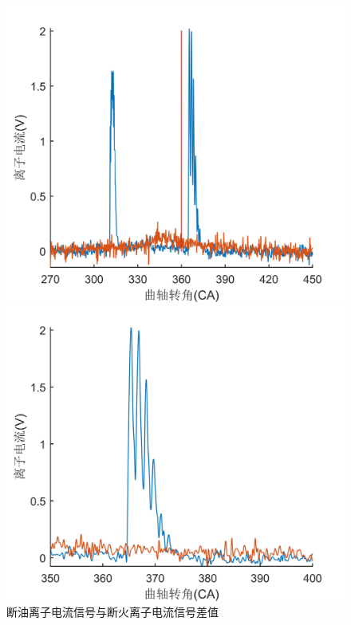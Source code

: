 \begin{figure}[htb]
	\begin{minipage}[t]{0.5\linewidth}
		\centering
		\includegraphics[width=\textwidth]{thesis_figure/ion_chapter/diff_dy_dh}
	\end{minipage}
	\begin{minipage}[t]{0.5\linewidth}
		\centering
		\includegraphics[width=\textwidth]{thesis_figure/ion_chapter/diff_dy_dh_detail}
	\end{minipage}
		\caption{断油离子电流信号与断火离子电流信号差值}
		\label{fig:diff_dy_dh}
\end{figure}

